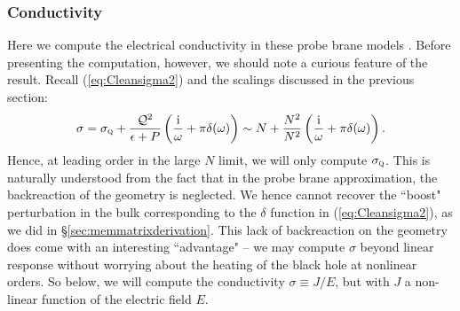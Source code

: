 \documentclass[10pt, oneside]{book}
\begin{document}
\begin{doublespace}
\subsubsection{Conductivity}
Here we compute the electrical conductivity in these probe brane models \cite{Karch:2007pd}.  Before presenting the computation, however, we should note a curious feature of the result.   Recall (\ref{eq:Cleansigma2}) and the scalings discussed in the previous section:  \begin{equation}
\sigma = \sigma_{\textsc{q}} + \frac{\mathcal{Q}^2}{\epsilon+P} \left(\frac{\mathrm{i}}{\omega}+\pi \delta(\omega)\right) \sim N + \frac{N^2}{N^2} \left(\frac{\mathrm{i}}{\omega}+\pi \delta(\omega)\right).
\end{equation}
Hence, at leading order in the large $N$ limit, we will only compute $\sigma_{\textsc{q}}$.   This is naturally understood from the fact that in the probe brane approximation, the backreaction of the geometry is neglected.   We hence cannot recover the ``boost" perturbation in the bulk corresponding to the $\delta$ function in (\ref{eq:Cleansigma2}), as we did in \S \ref{sec:memmatrixderivation}.   This lack of backreaction on the geometry does come with an interesting ``advantage" -- we may compute $\sigma$ beyond linear response without worrying about the heating of the black hole at nonlinear orders.    So below, we will compute the conductivity $\sigma \equiv J/E$,  but with $J$ a non-linear function of the electric field $E$.


\end{doublespace}
\end{document}
